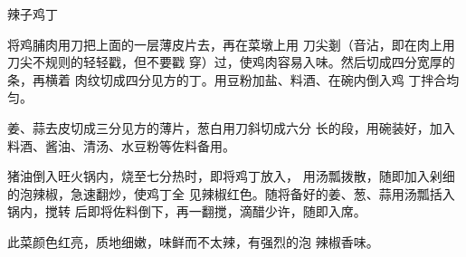 \begin{recipe}{辣子鸡丁}

\ingredients



\cooking

\step 将鸡脯肉用刀把上面的一层薄皮片去，再在菜墩上用 刀尖剗（音沾，即在肉上用刀尖不规则的轻轻戳，但不要戳 穿）过，使鸡肉容易入味。然后切成四分宽厚的条，再横着 肉纹切成四分见方的丁。用豆粉加盐、料酒、在碗内倒入鸡 丁拌合均匀。

姜、蒜去皮切成三分见方的薄片，葱白用刀斜切成六分 长的段，用碗装好，加入料酒、酱油、清汤、水豆粉等佐料备用。

\step 猪油倒入旺火锅内，烧至七分热时，即将鸡丁放入， 用汤瓢拨散，随即加入剁细的泡辣椒，急速翻炒，使鸡丁全 见辣椒红色。随将备好的姜、葱、蒜用汤瓢括入锅内，搅转 后即将佐料倒下，再一翻搅，滴醋少许，随即入席。

\notes

此菜颜色红亮，质地细嫩，味鲜而不太辣，有强烈的泡 辣椒香味。

\end{recipe}

